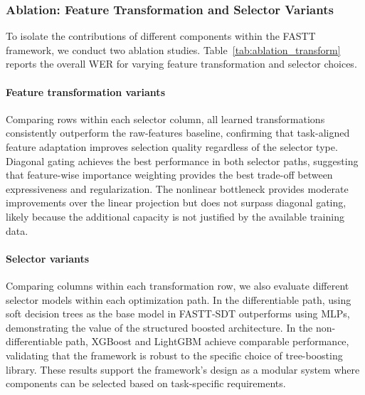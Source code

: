 \documentclass[journal]{IEEEtran}
\begin{document}
    
    

    \subsubsection{Ablation: Feature Transformation and Selector Variants}
    To isolate the contributions of different components within the FASTT
    framework, we conduct two ablation studies. Table~\ref{tab:ablation_transform}
    reports the overall WER for varying feature transformation and selector
    choices.

    \paragraph{Feature transformation variants}
    Comparing rows within each selector column, all learned transformations
    consistently outperform the raw-features baseline, confirming that task-aligned
    feature adaptation improves selection quality regardless of the selector type.
    Diagonal gating achieves the best performance in both selector paths, suggesting
    that feature-wise importance weighting provides the best trade-off between expressiveness
    and regularization. The nonlinear bottleneck provides moderate improvements
    over the linear projection but does not surpass diagonal gating, likely because
    the additional capacity is not justified by the available training data.

    \paragraph{Selector variants}
    Comparing columns within each transformation row, we also evaluate different
    selector models within each optimization path. In the differentiable path, using
    soft decision trees as the base model in FASTT-SDT outperforms using MLPs,
    demonstrating the value of the structured boosted architecture. In the non-differentiable
    path, XGBoost and LightGBM achieve comparable performance, validating that the
    framework is robust to the specific choice of tree-boosting library. These
    results support the framework's design as a modular system where components
    can be selected based on task-specific requirements.

    
\end{document}
